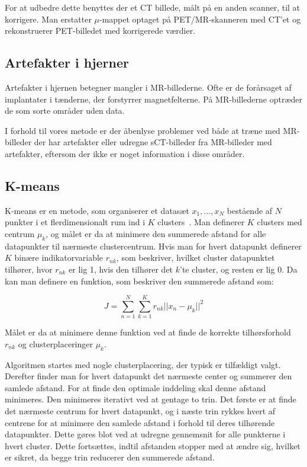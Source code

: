 For at udbedre dette benyttes der et CT billede, målt
på en anden scanner, til at korrigere. Man erstatter $\mu$-mappet
optaget på PET/MR-skanneren med CT'et og rekonstruerer PET-billedet med
korrigerede værdier.

\subsection{Artefakter i hjerner}

Artefakter i hjernen betegner mangler i MR-billederne. Ofte er de
forårsaget af implantater i tænderne, der forstyrrer magnetfelterne.
På MR-billederne optræder de som sorte områder uden data.

I forhold til vores metode er der åbenlyse problemer ved både at
træne med MR-billeder der har artefakter eller udregne sCT-billeder fra
MR-billeder med artefakter, eftersom der ikke er noget
information i disse områder.


\subsection{K-means}

K-means er en metode, som organiserer et datasæt ${x_1,...,x_N}$
bestående af $N$ punkter i et flerdimensionalt rum ind i $K$ clusters~\cite{bishop}.
Man definerer $K$ clusters med centrum $\mu_k$, og målet er da at
minimere den summerede afstand for alle datapunkter til nærmeste clustercentrum. Hvis man for hvert datapunkt definerer $K$ binære indikatorvariable $r_{nk}$, som beskriver, hvilket cluster datapunktet tilhører,
hvor $r_{nk}$ er lig 1, hvis den tilhører det $k$'te cluster, og resten
er lig 0. Da kan man definere en funktion, som beskriver den summerede
afstand som:

$$
J = \sum_{n=1}^{N} \sum_{k=1}^{K} r_{nk} || x_n - \mu_k ||^2
$$

Målet er da at minimere denne funktion ved at finde de korrekte
tilhørsforhold $r_{nk}$ og clusterplaceringer $\mu_k$.

Algoritmen startes med nogle clusterplacering, der typisk
er tilfældigt valgt. Derefter finder man for hvert datapunkt det
nærmeste center og summerer den samlede afstand. For at finde den
optimale inddeling skal denne afstand minimeres. Den minimeres iterativt
ved at gentage to trin. Det første er at finde det nærmeste centrum for
hvert datapunkt, og i næste trin rykkes hvert af centrene for at minimere
den samlede afstand i forhold til deres tilhørende datapunkter. Dette
gøres blot ved at udregne gennemsnit for alle punkterne i hvert cluster. Dette
fortsættes, indtil afstanden stopper med at ændre sig, hvilket er sikret,
da begge trin reducerer den summerede afstand.

